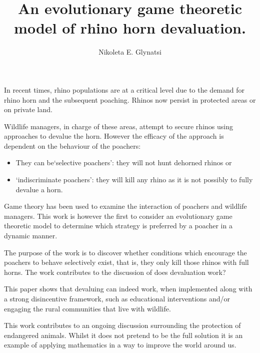 \documentclass{article}
\title{An evolutionary game theoretic model of rhino horn devaluation.}
\date{}
\author{Nikoleta E. Glynatsi}
\begin{document}
\maketitle

In recent times, rhino populations are at a critical level due to the demand for rhino
horn and the subsequent poaching. Rhinos now persist in protected areas or on private
land.

Wildlife managers, in charge of these areas, attempt to secure rhinos using approaches
to devalue the horn. However the efficacy of the approach is dependent on the behaviour of the poachers:

\begin{itemize}
    \item They can be`selective poachers’: they will not hunt dehorned rhinos or
    \item `indiscriminate poachers’: they will kill any rhino as it is not
        possibly to fully devalue a horn.
\end{itemize}

Game theory has been used to examine the interaction of poachers and wildlife
managers.
This work is however the first to consider an evolutionary game theoretic model to determine which
strategy is preferred by a poacher in a dynamic manner.

The purpose of the work is to discover whether conditions which encourage the poachers
to behave selectively exist, that is, they only kill those rhinos with full horns.
The work contributes to the discussion of does devaluation work?

This paper shows that devaluing can indeed work, when implemented along with a strong
disincentive framework, such as educational interventions and/or engaging the rural communities
that live with wildlife.

This work contributes to an ongoing discussion surrounding the protection of
endangered animals. Whilst it does not pretend to be the full solution it is an
example of applying mathematics in a way to improve the world around us.
\end{document}
